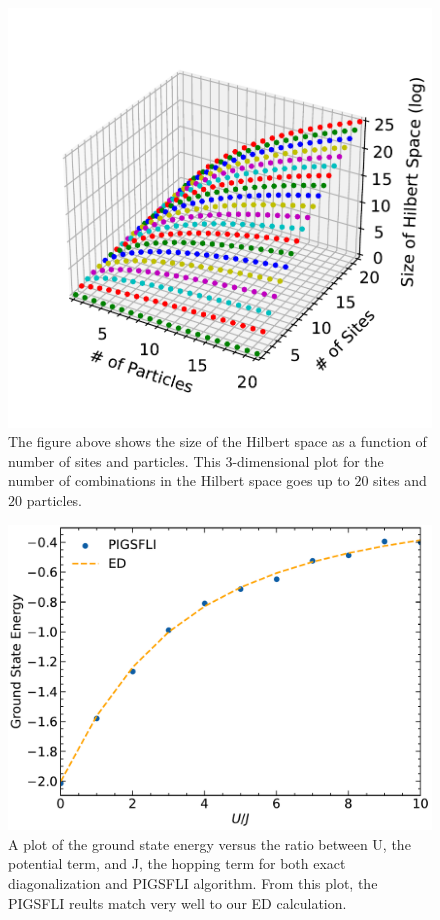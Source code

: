 \begin{figure}[h]
\centering
\includegraphics[scale=0.5]{../figures/hilbert_space_size.pdf}
\caption{The figure above shows the size of the Hilbert space as a function of number of sites and particles. This 3-dimensional plot for the number of combinations in the Hilbert space goes up to $20$ sites and $20$ particles.}
\label{fig:hilbert_space_size}
\end{figure}


\begin{figure}[H]
\centering
\includegraphics[scale=0.5]{../figures/total_energy.pdf}
\caption{A plot of the ground state energy versus the ratio between U, the potential term, and J, the hopping term for both exact diagonalization and PIGSFLI algorithm. From this plot, the PIGSFLI reults match very well to our ED calculation.}
\label{fig:total_energy}
\end{figure}

